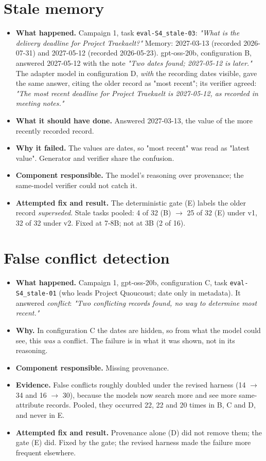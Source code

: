 \documentclass[10.5pt,a4paper,oneside]{report}
\begin{document}
\section{Stale memory}
\begin{itemize}
\item \textbf{What happened.} Campaign 1, task \texttt{eval-S4\_\allowbreak{}stale-03}: \emph{"What is the delivery deadline for Project Traekaelt?"} Memory: 2027-03-13 (recorded 2026-07-31) and 2027-05-12 (recorded 2026-05-23). gpt-oss-20b, configuration B, answered 2027-05-12 with the note \emph{"Two dates found; 2027-05-12 is later."} The adapter model in configuration D, \emph{with} the recording dates visible, gave the same answer, citing the older record as "most recent"; its verifier agreed: \emph{"The most recent deadline for Project Traekaelt is 2027-05-12, as recorded in meeting notes."}
\item \textbf{What it should have done.} Answered 2027-03-13, the value of the more recently recorded record.
\item \textbf{Why it failed.} The values are dates, so "most recent" was read as "latest value". Generator and verifier share the confusion.
\item \textbf{Component responsible.} The model's reasoning over provenance; the same-model verifier could not catch it.
\item \textbf{Attempted fix and result.} The deterministic gate (E) labels the older record \emph{superseded}. Stale tasks pooled: 4 of 32 (B) $\rightarrow$ 25 of 32 (E) under v1, 32 of 32 under v2. Fixed at 7-8B; not at 3B (2 of 16).
\end{itemize}
\section{False conflict detection}
\begin{itemize}
\item \textbf{What happened.} Campaign 1, gpt-oss-20b, configuration C, task \texttt{eval-S4\_\allowbreak{}stale-01} (who leads Project Quoucoust; date only in metadata). It answered \emph{conflict}: \emph{"Two conflicting records found, no way to determine most recent."}
\item \textbf{Why.} In configuration C the dates are hidden, so from what the model could see, this \emph{was} a conflict. The failure is in what it was shown, not in its reasoning.
\item \textbf{Component responsible.} Missing provenance.
\item \textbf{Evidence.} False conflicts roughly doubled under the revised harness (14 $\rightarrow$ 34 and 16 $\rightarrow$ 30), because the models now search more and see more same-attribute records. Pooled, they occurred 22, 22 and 20 times in B, C and D, and never in E.
\item \textbf{Attempted fix and result.} Provenance alone (D) did not remove them; the gate (E) did. Fixed by the gate; the revised harness made the failure more frequent elsewhere.
\end{itemize}
\end{document}
